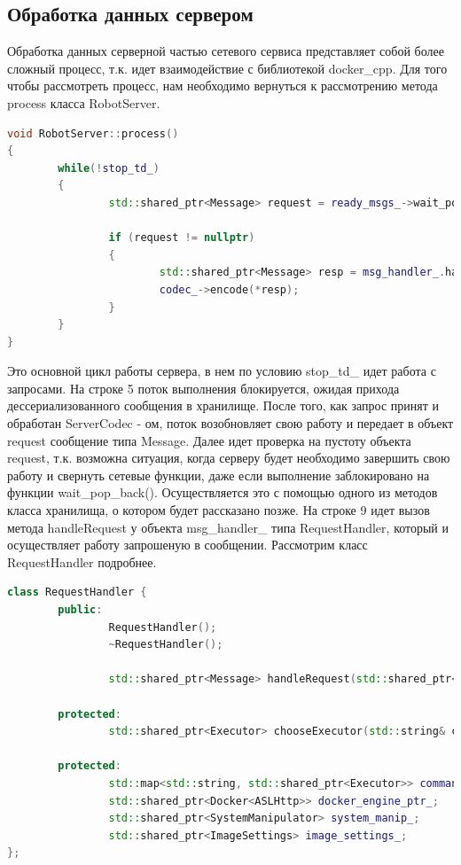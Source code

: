 \documentclass[a4paper, 14pt]{extreport}
\begin{document}
\subsection{Обработка данных сервером}
\par Обработка данных серверной частью сетевого сервиса представляет собой более сложный процесс, т.к. идет взаимодействие с библиотекой 
docker\_cpp. Для того чтобы рассмотреть процесс, нам необходимо вернуться к рассмотрению метода process класса RobotServer.
\begin{lstlisting}[language=C++, frame=single, xleftmargin=15pt, caption={Определение метода process класса RobotServer},label=DescriptiveLabel]
void RobotServer::process()
{
        while(!stop_td_)
        {
                std::shared_ptr<Message> request = ready_msgs_->wait_pop_back();

                if (request != nullptr)
                {
                        std::shared_ptr<Message> resp = msg_handler_.handleRequest(request);
                        codec_->encode(*resp);
                }
        }
}
\end{lstlisting}
\par Это основной цикл работы сервера, в нем по условию stop\_td\_ идет работа с запросами. На строке 5 поток выполнения блокируется, 
ожидая прихода дессериализованного сообщения в хранилище. После того, как запрос принят и обработан ServerCodec - ом, поток 
возобновляет свою работу и передает в объект request сообщение типа Message. Далее идет проверка на пустоту объекта request, т.к.
возможна ситуация, когда серверу будет необходимо завершить свою работу и свернуть сетевые функции, даже если выполнение заблокировано 
на функции wait\_pop\_back(). Осуществляется это с помощью одного из методов класса хранилища, о котором будет рассказано позже.
На строке 9 идет вызов метода handleRequest у объекта msg\_handler\_ типа RequestHandler, который и осуществляет работу запрошеную 
в сообщении. Рассмотрим класс RequestHandler подробнее.
\begin{lstlisting}[language=C++, frame=single, xleftmargin=15pt, caption={Заголовочный файл класса RequestHandler},label=DescriptiveLabel]
class RequestHandler {
        public:
                RequestHandler();
                ~RequestHandler();
        
                std::shared_ptr<Message> handleRequest(std::shared_ptr<Message> reciv_msg);
        
        protected:
                std::shared_ptr<Executor> chooseExecutor(std::string& command);
        
        protected:
                std::map<std::string, std::shared_ptr<Executor>> command_to_exec_;
                std::shared_ptr<Docker<ASLHttp>> docker_engine_ptr_;
                std::shared_ptr<SystemManipulator> system_manip_;
                std::shared_ptr<ImageSettings> image_settings_;
};
\end{lstlisting}
\end{document}
